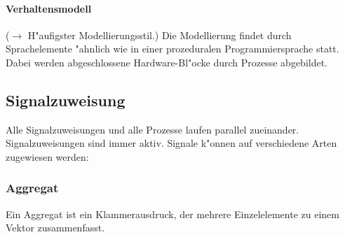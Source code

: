\paragraph{Verhaltensmodell} ($\rightarrow$ H"aufigster Modellierungsstil.) 
	Die Modellierung findet durch Sprachelemente "ahnlich wie in einer prozeduralen Programmiersprache statt.\\
	Dabei werden abgeschlossene Hardware-Bl"ocke durch Prozesse 
	abgebildet.
				
\begin{multicols}{2}
\subsection{Signalzuweisung}
Alle Signalzuweisungen und alle Prozesse laufen parallel zueinander. Signalzuweisungen sind immer aktiv. Signale k"onnen auf verschiedene Arten zugewiesen werden:
	
	\vfill\null
	\columnbreak
	\subsubsection{Aggregat}
	Ein Aggregat ist ein Klammerausdruck, der mehrere Einzelelemente zu einem Vektor zusammenfasst.
		
\end{multicols}

\newpage
	
